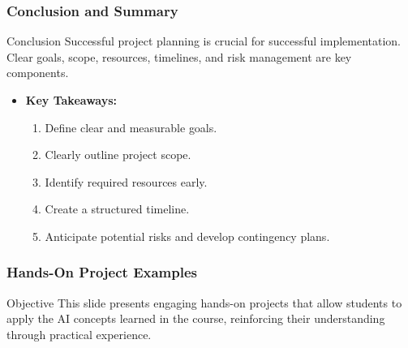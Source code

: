 \documentclass[aspectratio=169]{beamer}
\begin{document}
\begin{frame}[fragile]
    \frametitle{Conclusion and Summary}
    \begin{block}{Conclusion}
        Successful project planning is crucial for successful implementation. Clear goals, scope, resources, timelines, and risk management are key components.
    \end{block}
    
    \begin{itemize}
        \item \textbf{Key Takeaways:}
        \begin{enumerate}
            \item Define clear and measurable goals.
            \item Clearly outline project scope.
            \item Identify required resources early.
            \item Create a structured timeline.
            \item Anticipate potential risks and develop contingency plans.
        \end{enumerate}
    \end{itemize}
\end{frame}

\begin{frame}[fragile]
    \frametitle{Hands-On Project Examples}
    \begin{block}{Objective}
        This slide presents engaging hands-on projects that allow students to apply the AI concepts learned in the course, reinforcing their understanding through practical experience.
    \end{block}
\end{frame}
\end{document}
